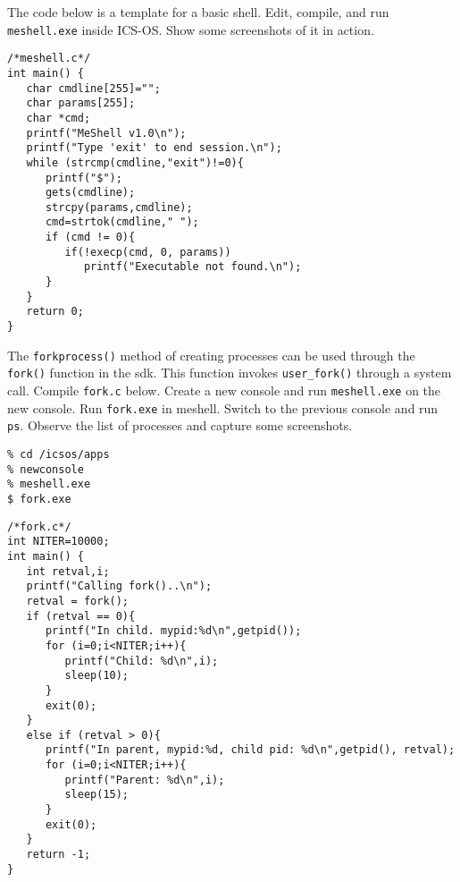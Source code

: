 \documentclass[a4paper, 11pt,oneside]{article}
\begin{document}
The code below is a template for a basic shell. Edit, compile, and run \texttt{meshell.exe} inside ICS-OS. Show some screenshots of it in action.  

\begin{verbatim}
/*meshell.c*/
int main() {
   char cmdline[255]="";
   char params[255];
   char *cmd;
   printf("MeShell v1.0\n");
   printf("Type 'exit' to end session.\n");
   while (strcmp(cmdline,"exit")!=0){
      printf("$");
      gets(cmdline);
      strcpy(params,cmdline);
      cmd=strtok(cmdline," ");
      if (cmd != 0){ 
         if(!execp(cmd, 0, params))
            printf("Executable not found.\n");
      }   
   }   
   return 0;
}

\end{verbatim}

\noindent{}

The \texttt{forkprocess()} method of creating processes can be used through the \texttt{fork()} function in the sdk. This function invokes  
\texttt{user\_fork()} through a system call. Compile \texttt{fork.c} below. Create a new console and run \texttt{meshell.exe} on the new console. Run \texttt{fork.exe} in meshell. Switch to the previous console and run \texttt{ps}. Observe the list of processes and capture some screenshots.
\begin{verbatim}
% cd /icsos/apps
% newconsole
% meshell.exe
$ fork.exe
\end{verbatim}

\begin{verbatim}
/*fork.c*/
int NITER=10000;
int main() {
   int retval,i;
   printf("Calling fork()..\n");
   retval = fork();
   if (retval == 0){
      printf("In child. mypid:%d\n",getpid());
      for (i=0;i<NITER;i++){
         printf("Child: %d\n",i);
         sleep(10);
      }
      exit(0);
   }
   else if (retval > 0){
      printf("In parent, mypid:%d, child pid: %d\n",getpid(), retval);
      for (i=0;i<NITER;i++){
         printf("Parent: %d\n",i);
         sleep(15);
      }
      exit(0);
   }
   return -1;
}
\end{verbatim}
\end{document}
